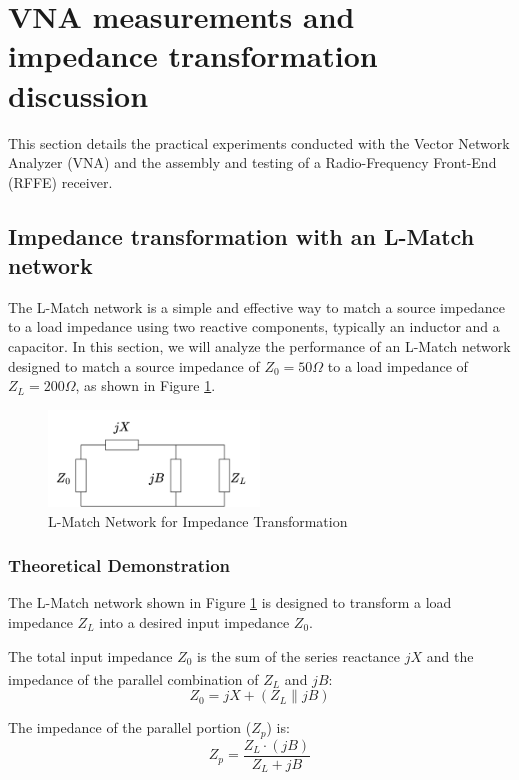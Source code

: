 \section{VNA measurements and impedance transformation discussion} 

This section details the practical experiments conducted with the Vector Network Analyzer (VNA) and the assembly and testing of a Radio-Frequency Front-End (RFFE) receiver. 

\subsection{Impedance transformation with an L-Match network}

The L-Match network is a simple and effective way to match a source impedance to a load impedance using two reactive components, typically an inductor and a capacitor. In this section, we will analyze the performance of an L-Match network designed to match a source impedance of \( Z_0 = 50 \Omega \) to a load impedance of \( Z_L = 200 \Omega \), as shown in Figure \ref{fig:match_network}.

\begin{figure}[H]
    \centering
    \includegraphics[width=0.5\textwidth]{Images/input-matching.png}
    \caption{L-Match Network for Impedance Transformation}
    \label{fig:match_network}
\end{figure}

\subsubsection{Theoretical Demonstration}
The L-Match network shown in Figure \ref{fig:match_network} is designed to transform a load impedance $Z_L$ into a desired input impedance $Z_{0}$. 

The total input impedance $Z_{0}$ is the sum of the series reactance $jX$ and the impedance of the parallel combination of $Z_L$ and $jB$\textsuperscript{\cite{Gillermo-Gonzalez}}:
$$Z_{0} = jX + (Z_L \parallel jB)$$

The impedance of the parallel portion ($Z_p$) is:
$$Z_p = \frac{Z_L \cdot (jB)}{Z_L + jB}$$

